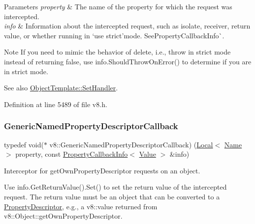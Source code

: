 \begin{DoxyParams}{Parameters}
{\em property} & The name of the property for which the request was intercepted. \\
\hline
{\em info} & Information about the intercepted request, such as isolate, receiver, return value, or whether running in `\textquotesingle{}use strict'{\ttfamily mode. See}Property\+Callback\+Info\`{}.\\
\hline
\end{DoxyParams}
\begin{DoxyNote}{Note}
If you need to mimic the behavior of {\ttfamily delete}, i.\+e., throw in strict mode instead of returning false, use {\ttfamily info.\+Should\+Throw\+On\+Error()} to determine if you are in strict mode.
\end{DoxyNote}
See also {\ttfamily \mbox{\hyperlink{classv8_1_1ObjectTemplate_a3d5666f1e9b0f46df6b4dbb7cfbb6114}{Object\+Template\+::\+Set\+Handler}}.} 

Definition at line 5489 of file v8.\+h.

\mbox{\label{namespacev8_a8cf8faa26baffa84173a24906c0d49f6}} 
\subsubsection{\texorpdfstring{Generic\+Named\+Property\+Descriptor\+Callback}{GenericNamedPropertyDescriptorCallback}}
{\footnotesize\ttfamily typedef void($\ast$ v8\+::\+Generic\+Named\+Property\+Descriptor\+Callback) (\mbox{\hyperlink{classv8_1_1Local}{Local}}$<$ \mbox{\hyperlink{classv8_1_1Name}{Name}} $>$ property, const \mbox{\hyperlink{classv8_1_1PropertyCallbackInfo}{Property\+Callback\+Info}}$<$ \mbox{\hyperlink{classv8_1_1Value}{Value}} $>$ \&info)}

Interceptor for get\+Own\+Property\+Descriptor requests on an object.

Use {\ttfamily info.\+Get\+Return\+Value().Set()} to set the return value of the intercepted request. The return value must be an object that can be converted to a \mbox{\hyperlink{classv8_1_1PropertyDescriptor}{Property\+Descriptor}}, e.\+g., a {\ttfamily v8\+::value} returned from {\ttfamily v8\+::\+Object\+::get\+Own\+Property\+Descriptor}.


